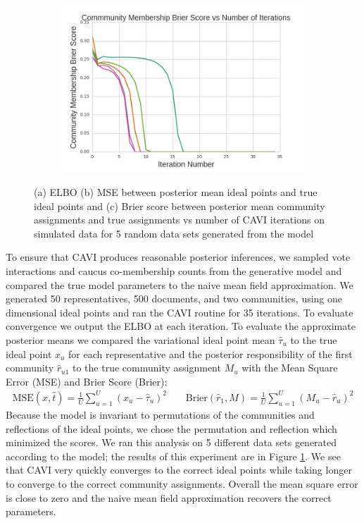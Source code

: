 \documentclass{article}
\begin{document}
\begin{figure}[h]
\begin{subfigure}[b]{0.3\textwidth}
        \includegraphics[width=\textwidth]{toy_resp_mse.png}
        \caption{}
    \end{subfigure}
  \caption{(a) ELBO (b) MSE between posterior mean ideal points and true ideal points and (c) Brier score between posterior mean community assignments and true assignments vs number of CAVI iterations on simulated data for 5 random data sets generated from the model}
      \label{fig:toy_results}
\end{figure}

To ensure that CAVI produces reasonable posterior inferences, we sampled vote interactions and caucus co-membership counts from the generative model and compared the true model parameters to the naive mean field approximation. We generated 50 representatives, 500 documents, and two communities, using one dimensional ideal points and ran the CAVI routine for 35 iterations. To evaluate convergence we output the ELBO at each iteration. To evaluate the approximate posterior means we compared the variational ideal point mean $\hat{\tau}_u$ to the true ideal point $x_u$ for each representative and the posterior responsibility of the first community $\hat{r}_{u1}$ to the true community assignment $M_u$ with the Mean Square Error (MSE) and Brier Score (Brier):
\begin{align*}
 \text{MSE}(x, \hat{t}) = \frac{1}{U} \sum_{u=1}^U (x_u - \hat{\tau}_u) ^2  \;\; & \;\; \text{Brier}(\hat{r}_1, M) = \frac{1}{U} \sum_{u=1}^U (M_u - \hat{r}_u)^2
\end{align*}
Because the model is invariant to permutations of the communities and reflections of the ideal points, we chose the permutation and reflection which minimized the scores. We ran this analysis on 5 different data sets generated according to the model; the results of this experiment are in Figure \ref{fig:toy_results}. We see that CAVI very quickly converges to the correct ideal points while taking longer to converge to the correct community assignments. Overall the mean square error is close to zero and the naive mean field approximation recovers the correct parameters.
\end{document}
